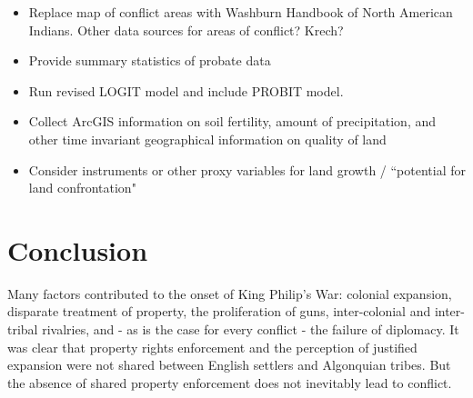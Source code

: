 \documentclass[11pt, oneside]{article}
\begin{document}
\begin{itemize}
\item{Replace map of conflict areas with Washburn Handbook of North American Indians. Other data sources for areas of conflict? Krech?}
\item{Provide summary statistics of probate data}
\item{Run revised LOGIT model and include PROBIT model.} 
\item{Collect ArcGIS information on soil fertility, amount of precipitation, and other time invariant geographical information on quality of land}
\item{Consider instruments or other proxy variables for land growth / ``potential for land confrontation"}



\end{itemize}

\section{Conclusion}
Many factors contributed to the onset of King Philip's War:  colonial expansion, disparate treatment of property, the proliferation of guns, inter-colonial and inter-tribal rivalries, and - as is the case for every conflict - the failure of diplomacy. It was clear that property rights enforcement and the perception of justified expansion were not shared between English settlers and Algonquian tribes. But the absence of shared property enforcement does not inevitably lead to conflict. 
\end{document}

